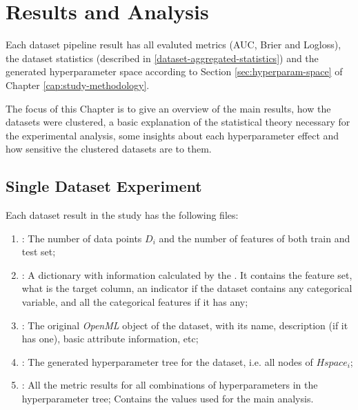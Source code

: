 \chapter{Results and Analysis}
\label{cap:results}

Each dataset pipeline result has all evaluted metrics (AUC, Brier and Logloss), the dataset statistics (described in \ref{dataset-aggregated-statistics}) and the generated hyperparameter space according to Section \ref{sec:hyperparam-space} of Chapter \ref{cap:study-methodology}.

The focus of this Chapter is to give an overview of the main results, how the datasets were clustered, a basic explanation of the statistical theory necessary for the experimental analysis,  some insights about each hyperparameter effect and how sensitive the clustered datasets are to them.


\section{Single Dataset Experiment}
\label{sec:single-dataset}

Each dataset result in the study has the following files:

\begin{enumerate}
    \item \textbf{}: The number of data points $D_i$ and the number of features of both train and test set;
    \item \textbf{}: A dictionary with information calculated by the . It contains the feature set, what is the target column, an indicator if the dataset contains any categorical variable, and all the categorical features if it has any;
    \item \textbf{}: The original \textit{OpenML} object of the dataset, with its name, description (if it has one), basic attribute information, etc;
    \item \textbf{}: The generated hyperparameter tree for the dataset, i.e. all nodes of $Hspace_i$;
    \item \textbf{}: All the metric results for all combinations of hyperparameters in the hyperparameter tree; Contains the values used for the main analysis.
\end{enumerate}

